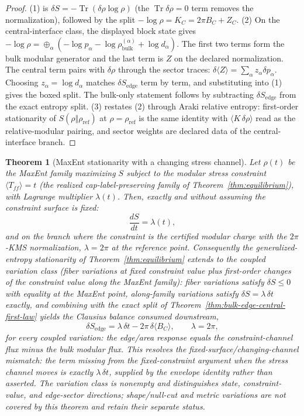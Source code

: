 \documentclass[11pt]{article}
\newtheorem{theorem}{Theorem}[section]
\begin{document}
\begin{proof}
(1) is \(\delta S=-\operatorname{Tr}(\delta\rho\log\rho)\) (the
\(\operatorname{Tr}\delta\rho=0\) term removes the normalization), followed
by the split \(-\log\rho=K_C=2\pi B_C+Z_C\). (2) On the central-interface
class, the displayed block state gives
\(-\log\rho=\oplus_\alpha(-\log p_\alpha-
\log\rho^{(\alpha)}_{\mathrm{bulk}}+\log d_\alpha)\). The first two terms
form the bulk modular generator and the last term is \(Z\) on the declared
normalization.
The central term pairs with \(\delta\rho\) through the sector traces:
\(\delta\langle Z\rangle=\sum_\alpha z_\alpha\delta p_\alpha\). Choosing
\(z_\alpha=\log d_\alpha\) matches \(\delta S_{\mathrm{edge}}\) term by term,
and substituting into (1) gives the boxed split. The bulk-only statement
follows by subtracting \(\delta S_{\mathrm{edge}}\) from the exact entropy
split. (3) restates (2) through Araki relative entropy: first-order
stationarity of \(S(\rho\Vert\rho_{\mathrm{ref}})\) at
\(\rho=\rho_{\mathrm{ref}}\) is the same identity with
\(\langle K\,\delta\rho\rangle\) read as the relative-modular pairing, and
sector weights are declared data of the central-interface branch.
\end{proof}

\begin{theorem}[MaxEnt stationarity with a changing stress channel]
\label{thm:maxent-lagrange-stationarity}
Let \(\rho(t)\) be the MaxEnt family maximizing \(S\) subject to the modular
stress constraint \(\langle T_{ff}\rangle=t\) (the realized cap-label-preserving
family of Theorem~\ref{thm:equilibrium}), with Lagrange multiplier
\(\lambda(t)\). Then, exactly and without assuming the constraint surface is
fixed:
\[
\frac{dS}{dt}=\lambda(t),
\]
and on the branch where the constraint is the certified modular charge with
the \(2\pi\)-KMS normalization, \(\lambda=2\pi\) at the reference point.
Consequently the generalized-entropy stationarity of
Theorem~\ref{thm:equilibrium} extends to the \emph{coupled} variation class
(fiber variations at fixed constraint value \emph{plus} first-order changes
of the constraint value along the MaxEnt family): fiber variations satisfy
\(\delta S\leq0\) with equality at the MaxEnt point, along-family variations
satisfy \(\delta S=\lambda\,\delta t\) exactly, and combining with the exact
split of Theorem~\ref{thm:bulk-edge-central-first-law} yields the Clausius
balance consumed downstream,
\[
\delta S_{\mathrm{edge}}
=\lambda\,\delta t-2\pi\,\delta\langle B_C\rangle ,
\qquad \lambda=2\pi ,
\]
for every coupled variation: the edge/area response equals the
constraint-channel flux minus the bulk modular flux. This resolves the
fixed-surface/changing-channel mismatch: the term missing from the
fixed-constraint argument when the stress channel moves is exactly
\(\lambda\,\delta t\), supplied by the envelope identity rather than
asserted. The variation class
is nonempty and distinguishes state, constraint-value, and edge-sector
directions; shape/null-cut and metric variations are \emph{not} covered by
this theorem and retain their separate status.
\end{theorem}
\end{document}
